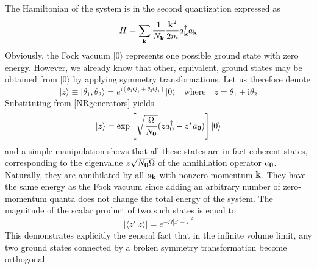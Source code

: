 \documentclass[final,3p,times,12pt,a4paper,sort&compress]{elsarticle}
\newcommand\vek[1]{{\boldsymbol{\bf #1}}}   %
\newcommand\ket[1]{\vert#1\rangle}          %
\newcommand\braket[2]{\langle#1\vert#2\rangle} %
\newcommand\he[1]{#1^{\dagger}}             %
\newcommand\imag{\mathrm i}                 %
\newcommand\vt{\theta}
\newcommand\abs[1]{\left|#1\right|}         %
\begin{document}
The Hamiltonian of the system is in the second quantization expressed as
\begin{equation}
H=\sum_{\vek k}\frac1{N_{\vek k}}\frac{\vek k^2}{2m}\he a_{\vek k}a_{\vek k}
\label{NRHamiltonian}
\end{equation}
Obviously, the Fock vacuum $\ket0$ represents one possible ground state with
zero energy. However, we already know that other, equivalent, ground states may
be obtained from $\ket0$ by applying symmetry transformations. Let us therefore
denote
\begin{equation}
\ket z\equiv\ket{\vt_1,\vt_2}=e^{\imag(\vt_1Q_1+\vt_2Q_2)}\ket0\quad
\text{where}\quad z=\vt_1+\imag\vt_2
\end{equation}
Substituting from \eqref{NRgenerators} yields
\begin{equation}
\ket z=\exp\left[\sqrt{\frac{\Omega}{N_\vek0}}(z\he
a_{\vek0}-z^*a_{\vek0})\right]\ket0
\end{equation}
and a simple manipulation shows that all these states are in fact coherent
states, corresponding to the eigenvalue $z\sqrt{N_{\vek0}\Omega}$ of the
annihilation operator $a_{\vek0}$. Naturally, they are annihilated by all
$a_{\vek k}$ with nonzero momentum $\vek k$. They have the same energy as the
Fock vacuum since adding an arbitrary number of zero-momentum quanta does not
change the total energy of the system. The magnitude of the scalar product of
two such states is equal to
\begin{equation}
\abs{\braket{z'}{z}}=e^{-\Omega\abs{z'-z}^2}
\end{equation}
This demonstrates explicitly the general fact that in the infinite volume
limit, any two ground states connected by a broken symmetry transformation
become orthogonal.
\end{document}
